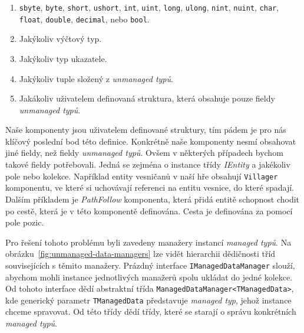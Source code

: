 \begin{enumerate}
  \item \texttt{sbyte}, \texttt{byte}, \texttt{short}, \texttt{ushort}, \texttt{int}, \texttt{uint}, \texttt{long}, \texttt{ulong}, \texttt{nint}, \texttt{nuint}, \texttt{char}, \texttt{float}, \texttt{double}, \texttt{decimal}, nebo \texttt{bool}.

  \item Jakýkoliv výčtový typ.
  
  \item Jakýkoliv typ ukazatele.

  \item Jakýkoliv tuple složený z \textit{unmanaged typů}.

  \item Jakákoliv uživatelem definovaná struktura, která obsahuje pouze fieldy \textit{unmanaged typů}.
\end{enumerate}

Naše komponenty jsou uživatelem definované struktury, tím pádem je pro nás klíčový poslední bod této definice. Konkrétně naše komponenty nesmí obsahovat jiné fieldy, než fieldy \textit{unmanaged typů}. Ovšem v některých případech bychom takové fieldy potřebovali. Jedná se zejména o instance třídy \textit{IEntity} a jakékoliv pole nebo kolekce. Například entity vesničanů v naší hře obsahují \texttt{Villager} komponentu, ve které si uchovávají referenci na entitu vesnice, do které spadají. Dalším příkladem je \textit{PathFollow} komponenta, která přidá entitě schopnost chodit po cestě, která je v této komponentě definována. Cesta je definována za pomocí pole pozic.

Pro řešení tohoto problému byli zavedeny manažery instancí \textit{managed typů}. Na obrázku~\ref{fig:unmanaged-data-managers} lze vidět hierarchii dědičnosti tříd souvisejících s těmito manažery. Prázdný interface \texttt{IManagedDataManager} slouží, abychom mohli instance jednotlivých manažerů spolu ukládat do jedné kolekce. Od tohoto interface dědí abstraktní třída \texttt{ManagedDataManager<TManagedData>}, kde generický parametr \texttt{TManagedData} představuje \textit{managed typ}, jehož instance chceme spravovat. Od této třídy dědí třídy, které se starají o správu konkrétních \textit{managed typů}.


